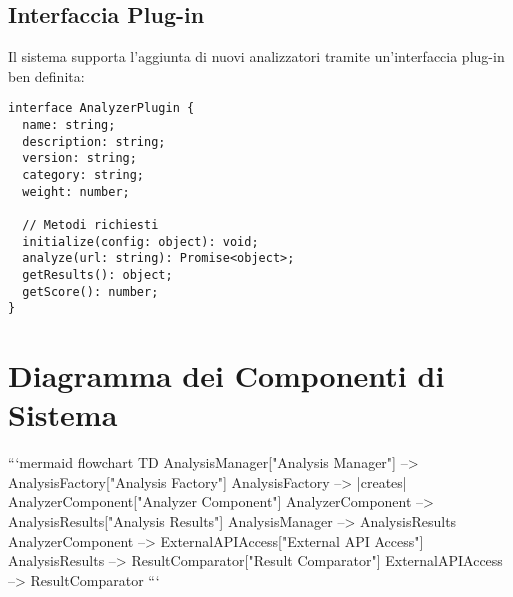 \subsection{Interfaccia Plug-in}
Il sistema supporta l'aggiunta di nuovi analizzatori tramite un'interfaccia plug-in ben definita:

\begin{verbatim}
interface AnalyzerPlugin {
  name: string;
  description: string;
  version: string;
  category: string;
  weight: number;
  
  // Metodi richiesti
  initialize(config: object): void;
  analyze(url: string): Promise<object>;
  getResults(): object;
  getScore(): number;
}
\end{verbatim}

\section{Diagramma dei Componenti di Sistema}

```mermaid
flowchart TD
    AnalysisManager["Analysis Manager"] --> AnalysisFactory["Analysis Factory"]
    AnalysisFactory --> |creates| AnalyzerComponent["Analyzer Component"]
    AnalyzerComponent --> AnalysisResults["Analysis Results"]
    AnalysisManager --> AnalysisResults
    AnalyzerComponent --> ExternalAPIAccess["External API Access"]
    AnalysisResults --> ResultComparator["Result Comparator"]
    ExternalAPIAccess --> ResultComparator
```